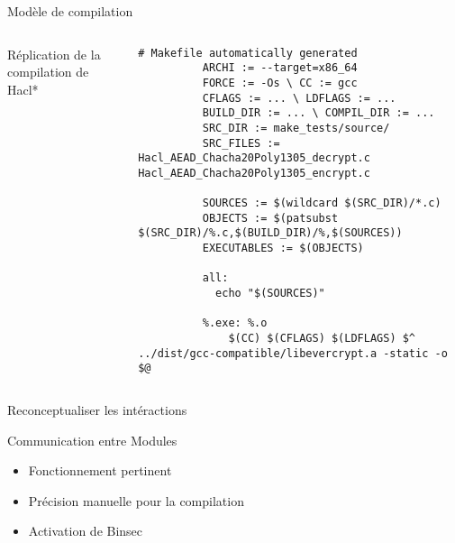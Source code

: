 \documentclass[A4,svgnames,9pt,aspectratio=169]{beamer}
\begin{document}
\begin{frame}[fragile]{Modèle de compilation}

  \begin{columns}
    \begin{column}{0.4\textwidth}
      \begin{block}{Réplication de la compilation de Hacl*}
        \large{
                }
      \end{block}
    \end{column}
    \begin{column}{0.6\textwidth}
        \begin{lstlisting}[style=MakefileStyle, gobble=10, caption={build.sh}]
          # Makefile automatically generated
          ARCHI := --target=x86_64
          FORCE := -Os \ CC := gcc
          CFLAGS := ... \ LDFLAGS := ...
          BUILD_DIR := ... \ COMPIL_DIR := ...
          SRC_DIR := make_tests/source/
          SRC_FILES := Hacl_AEAD_Chacha20Poly1305_decrypt.c Hacl_AEAD_Chacha20Poly1305_encrypt.c

          SOURCES := $(wildcard $(SRC_DIR)/*.c)
          OBJECTS := $(patsubst $(SRC_DIR)/%.c,$(BUILD_DIR)/%,$(SOURCES))
          EXECUTABLES := $(OBJECTS)

          all:
            echo "$(SOURCES)"

          %.exe: %.o
	          $(CC) $(CFLAGS) $(LDFLAGS) $^ ../dist/gcc-compatible/libevercrypt.a -static -o $@
        \end{lstlisting}
    \end{column}
  \end{columns}
\end{frame}

\begin{frame}{Reconceptualiser les intéractions}
  \begin{block}{Communication entre Modules}
    \begin{itemize}
      \item Fonctionnement pertinent
      \item Précision manuelle pour la compilation
      \item Activation de Binsec
    \end{itemize}
  \end{block}
\end{frame}
\end{document}
